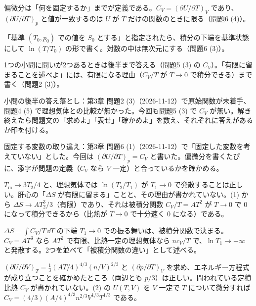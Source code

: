 \begin{daiji}
  \item 偏微分は「何を固定するか」までが定義である。$C_{V}=(\partial U/\partial T)_{V}$ であり、$(\partial U/\partial T)_{p}$ と値が一致するのは $U$ が $T$ だけの関数のときに限る（問題6 (4)）。
  \item 「基準 $(T_{0},p_{0})$ での値を $S_{0}$ とする」と指定されたら、積分の下端を基準状態にして $\ln(T/T_{0})$ の形で書く。対数の中は無次元にする（問題6 (3)）。
  \item 1つの小問に問いが2つあるときは後半まで答える（問題5 (3) の $C_{V}$）。「有限に留まることを述べよ」には、有限になる理由（$C_{V}/T$ が $T\to0$ で積分できる）まで書く（問題2 (3)）。
\end{daiji}
\begin{maemo}
  \item 小問の後半の答え落とし：第3章 問題2 (3)（2026-11-12）で原始関数が未着手、問題4 (5) で理想気体との比較が無かった。今回も問題5 (3) で $C_{V}$ が無い。解き終えたら問題文の「求めよ」「表せ」「確かめよ」を数え、それぞれに答えがあるか印を付ける。
  \item 固定する変数の取り違え：第3章 問題6 (1)（2026-11-12）で「固定した変数を考えていない」とした。今回は $(\partial U/\partial T)_{p}=C_{V}$ と書いた。偏微分を書くたびに、添字が問題の定義（$C_{V}$ なら $V$ 一定）と合っているかを確かめる。
\end{maemo}
\begin{kotaeran}
   $T_{\mathrm{m}}\to 3T_{2}/4$ と、理想気体では $\ln(T_{2}/T_{1})$ が $T_{1}\to0$ で発散することは正しい。肝心の「$\Delta S$ が有限に留まる」ことと、その理由が書かれていない。(1) から $\Delta S\to AT_{2}^{3}/3$（有限）であり、それは被積分関数 $C_{V}/T=AT^{2}$ が $T\to0$ で $0$ になって積分できるから（比熱が $T\to0$ で十分速く $0$ になる）である。
\end{kotaeran}
\begin{rikai}
  \item $\Delta S=\int C_{V}/T\,\dd T$ の下端 $T_{1}\to0$ での振る舞いは、被積分関数で決まる。$C_{V}=AT^{3}$ なら $AT^{2}$ で有限、比熱一定の理想気体なら $nc_{V}/T$ で、$\ln T_{1}\to-\infty$ と発散する。2つを並べて「被積分関数の違い」として述べる。
\end{rikai}
\begin{kotaeran}
   $(\partial U/\partial V)_{T}=\frac{1}{3}(AT/4)^{4/3}(n/V)^{2/3}$ と $(\partial p/\partial T)_{V}$ を求め、エネルギー方程式が成り立つことを確かめたところ（両辺とも $p/3$）は正しい。問われている定積比熱 $C_{V}$ が書かれていない。(2) の $U(T,V)$ を $V$ 一定で $T$ について微分すれば $C_{V}=(4/3)(A/4)^{4/3}n^{2/3}V^{1/3}T^{1/3}$ である。
\end{kotaeran}
